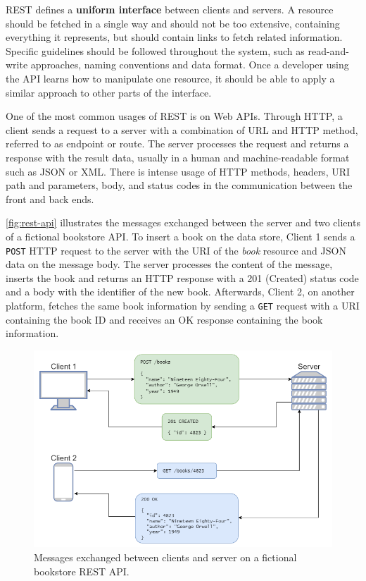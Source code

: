 REST defines a \textbf{uniform interface} between clients and servers. A resource should be fetched in a single way and should not be too extensive, containing everything it represents, but should contain links to fetch related information. Specific guidelines should be followed throughout the system, such as read-and-write approaches, naming conventions and data format. Once a developer using the API learns how to manipulate one resource, it should be able to apply a similar approach to other parts of the interface.

One of the most common usages of REST is on Web APIs. Through HTTP, a client sends a request to a server with a combination of URL and HTTP method, referred to as endpoint or route. The server processes the request and returns a response with the result data, usually in a human and machine-readable format such as JSON or XML. There is intense usage of HTTP methods, headers, URI path and parameters, body, and status codes in the communication between the front and back ends.

\autoref{fig:rest-api} illustrates the messages exchanged between the server and two clients of a fictional bookstore API. To insert a book on the data store, Client 1 sends a \texttt{POST} HTTP request to the server with the URI of the \textit{book} resource and JSON data on the message body. The server processes the content of the message, inserts the book and returns an HTTP response with a 201 (Created) status code and a body with the identifier of the new book. Afterwards, Client 2, on another platform, fetches the same book information by sending a \texttt{GET} request with a URI containing the book ID and receives an OK response containing the book information.

\begin{figure}[htbp]
  \centering
  \includegraphics[scale=0.565]{Imagens/chap02/rest-api.png}
  \caption{Messages exchanged between clients and server on a fictional bookstore REST API.}
  \label{fig:rest-api}
\end{figure}

